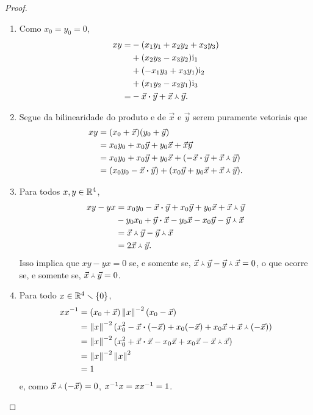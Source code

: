 \begin{proof}
\begin{enumerate}
	\item Como $x_0=y_0=0$,
	\begin{align*}
	xy =& -(x_1y_1 + x_2y_2 + x_3y_3) \\
			&+ (x_2y_3-x_3y_2) \mathrm{i}_1 \\
			&+ (-x_1y_3+x_3y_1) \mathrm{i}_2 \\
			&+ (x_1y_2-x_2y_1) \mathrm{i}_3 \\
		=& - {\vec{x}} \bm{\cdot} {\vec{y}} + {\vec{x}} \Yup {\vec{y}}.
	\end{align*}

	\item Segue da bilinearidade do produto e de $\vec{x}$ e $\vec{y}$ serem puramente vetoriais que
	\begin{align*}
	xy &= ({x}_0+\vec{x})({y}_0+\vec{y}) \\
		&= {x}_0{y}_0+{x}_0\vec{y}+{y}_0\vec{x}+\vec{x}\vec{y} \\
		&= {x}_0{y}_0+{x}_0\vec{y}+{y}_0\vec{x}+(-{\vec{x}} \bm{\cdot} {\vec{y}} + {\vec{x}} \Yup {\vec{y}}) \\
		&= ({x}_0{y}_0 - {\vec{x}} \bm{\cdot} {\vec{y}}) + ({x}_0\vec{y}+{y}_0\vec{x}+{\vec{x}} \Yup {\vec{y}}).
	\end{align*}
	
	\item Para todos $x,y \in \mathbb{R}^4$,
		\begin{align*}
		xy - yx &= {x}_0{y}_0 - {\vec{x}} \bm{\cdot} {\vec{y}}+{x}_0\vec{y}+{y}_0\vec{x}+{\vec{x}} \Yup {\vec{y}} \\
			&- {y}_0{x}_0 + {\vec{y}} \bm{\cdot} {\vec{x}}-{y}_0\vec{x}-{x}_0\vec{y}-{\vec{y}} \Yup {\vec{x}} \\
			&= {\vec{x}} \Yup {\vec{y}} - {\vec{y}} \Yup {\vec{x}} \\
			&= 2{\vec{x}} \Yup {\vec{y}}.
		\end{align*}
Isso implica que $xy-yx=0$ se, e somente se, ${\vec{x}} \Yup {\vec{y}} - {\vec{y}} \Yup {\vec{x}}=0$, o que ocorre se, e somente se, ${\vec{x}} \Yup {\vec{y}}=0$.%

	\item Para todo $x \in \mathbb{R}^4 \smallsetminus \{0\}$,
	\begin{align*}
	xx^{-1} &= ({x}_0+\vec{x})\left\Vert{x}\right\Vert^{-2}({x}_0-\vec{x}) \\
		&= \left\Vert{x}\right\Vert^{-2}({x}_0^2-{\vec{x}} \bm{\cdot} {(-\vec{x})}+{x}_0(-\vec{x})+{x}_0\vec{x}+{\vec{x}} \Yup {(-\vec{x})}) \\
		&= \left\Vert{x}\right\Vert^{-2}({x}_0^2+{\vec{x}} \bm{\cdot} {\vec{x}}-{x}_0\vec{x}+{x}_0\vec{x}-{\vec{x}} \Yup {\vec{x}}) \\
		&= \left\Vert{x}\right\Vert^{-2}\left\Vert{x}\right\Vert^2 \\
		&= 1
	\end{align*}
e, como ${\vec{x}} \Yup {(-\vec{x})} = 0$, $x^{-1} x = xx^{-1} = 1$.


\end{enumerate}
\end{proof}

